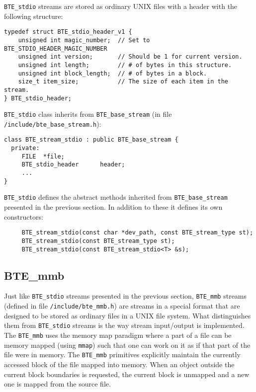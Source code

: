 
\verb|BTE_stdio| streams are stored as ordinary UNIX files with a header
with the following structure:

\begin{verbatim}
typedef struct BTE_stdio_header_v1 { 
    unsigned int magic_number;  // Set to BTE_STDIO_HEADER_MAGIC_NUMBER
    unsigned int version;       // Should be 1 for current version.
    unsigned int length;        // # of bytes in this structure.
    unsigned int block_length;  // # of bytes in a block.
    size_t item_size;           // The size of each item in the stream.
} BTE_stdio_header;
\end{verbatim}

\verb|BTE_stdio| class inherits from \verb|BTE_base_stream| (in file
\verb|/include/bte_base_stream.h|):
\begin{verbatim}
class BTE_stream_stdio : public BTE_base_stream {
  private:
     FILE  *file;          
     BTE_stdio_header      header;
     ...
}  
\end{verbatim}

\verb|BTE_stdio| defines the abstract methods inherited from
\verb|BTE_base_stream| presented in the previous section. In addition to these it defines its own
constructors:

\begin{verbatim}
     BTE_stream_stdio(const char *dev_path, const BTE_stream_type st); 
     BTE_stream_stdio(const BTE_stream_type st); 
     BTE_stream_stdio(const BTE_stream_stdio<T> &s);
\end{verbatim}


\subsection{BTE\_mmb}

\tobeextended

Just like \verb|BTE_stdio| streams presented in the previous section,
\verb|BTE_mmb| streams (defined in file \verb|/include/bte_mmb.h|) are
streams in a special format that are designed to be stored as ordinary
files in a UNIX file system. What distinguishes them from \verb|BTE_stdio|
streams is the way stream input/output is implemented. The \verb|BTE_mmb|
uses the memory map paradigm where a part of a file can be memory mapped
(using \verb|mmap|) such that one can work on it as if that part of the
file were in memory. The \verb|BTE_mmb| primitives explicitly maintain the
currently accessed block of the file mapped into memory. When an object
outside the current block boundaries is requested, the current block is
unmapped and a new one is mapped from the source file.

